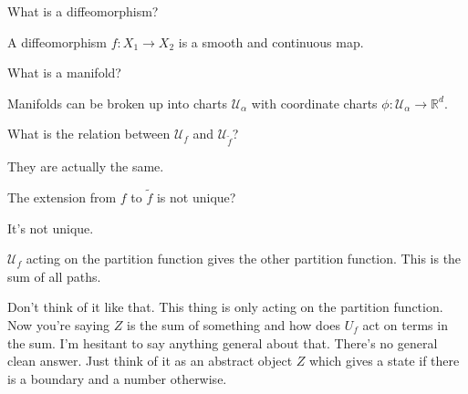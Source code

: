 \begin{question}
    What is a diffeomorphism?
\end{question}
A diffeomorphism $f:X_1 \to X_2$ is a smooth and continuous map.

\begin{question}
    What is a manifold?
\end{question}
Manifolds can be broken up into charts $\mathcal{U}_\alpha$
with coordinate charts $\phi: \mathcal{U}_\alpha\to \mathbb{R}^d$.

\begin{question}
What is the relation between $\mathcal{U}_{f}$ and
$\mathcal{U}_{\tilde{f}}$?
\end{question}
They are actually the same.

\begin{question}
    The extension from $f$ to $\tilde{f}$ is not unique?
\end{question}
It's not unique.

\begin{question}
    $\mathcal{U}_f$ acting on the partition function
    gives the other partition function.
    This is the sum of all paths.
\end{question}
Don't think of it like that.
This thing is only acting on the partition function.
Now you're saying $Z$ is the sum of something
and how does $U_{f}$ act on terms in the sum.
I'm hesitant to say anything general about that.
There's no general clean answer.
Just think of it as an abstract object $Z$
which gives a state if there is a boundary
and a number otherwise.

